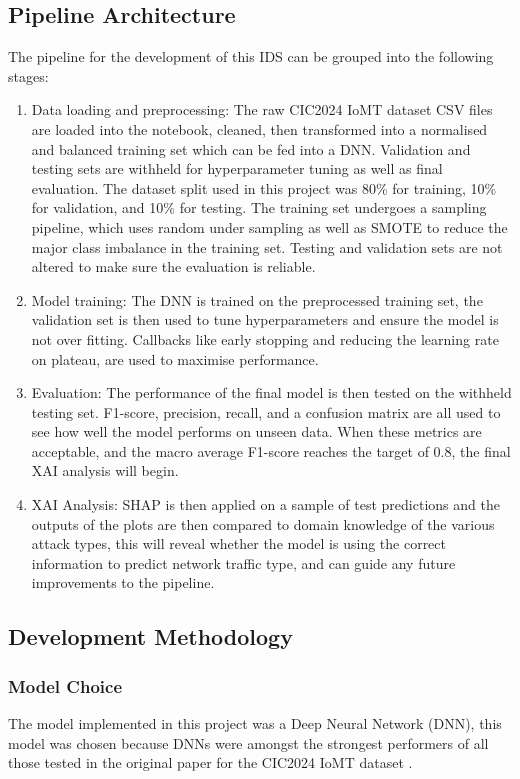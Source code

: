 \documentclass[11pt,a4paper]{article}
\begin{document}
\subsection{Pipeline Architecture}
The pipeline for the development of this IDS can be grouped into the following stages:
\begin{enumerate}
    \item Data loading and preprocessing: The raw CIC2024 IoMT dataset CSV files are loaded into the notebook, cleaned, then transformed into a normalised and balanced training set which can be fed into a DNN. Validation and testing sets are withheld for hyperparameter tuning as well as final evaluation. The dataset split used in this project was 80\% for training, 10\% for validation, and 10\% for testing. The training set undergoes a sampling pipeline, which uses random under sampling as well as SMOTE to reduce the major class imbalance in the training set. Testing and validation sets are not altered to make sure the evaluation is reliable.
    \item Model training: The DNN is trained on the preprocessed training set, the validation set is then used to tune hyperparameters and ensure the model is not over fitting. Callbacks like early stopping and reducing the learning rate on plateau, are used to maximise performance.
    \item Evaluation: The performance of the final model is then tested on the withheld testing set. F1-score, precision, recall, and a confusion matrix are all used to see how well the model performs on unseen data. When these metrics are acceptable, and the macro average F1-score reaches the target of $0.8$, the final XAI analysis will begin.
    \item XAI Analysis: SHAP is then applied on a sample of test predictions and the outputs of the plots are then compared to domain knowledge of the various attack types, this will reveal whether the model is using the correct information to predict network traffic type, and can guide any future improvements to the pipeline.
\end{enumerate}

\subsection{Development Methodology}
\subsubsection{Model Choice}
The model implemented in this project was a Deep Neural Network (DNN), this model was chosen because DNNs were amongst the strongest performers of all those tested in the original paper for the CIC2024 IoMT dataset \cite{dadkhah2024ciciomt2024}.
\end{document}
